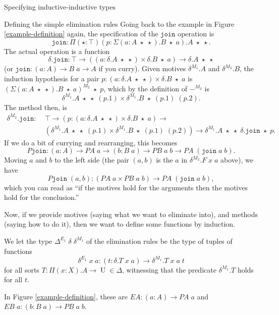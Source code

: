 \documentclass[acmsmall,review]{acmart}\settopmatter{printfolios=true,printccs=false,printacmref=false}
\DeclareMathOperator{\UU}{U}
\newcommand{\join}{\texttt{join}}
\begin{document}
\begin{section}{Specifying inductive-inductive types}
\begin{subsection}{\label{simple-elim-section}Defining the simple elimination rules}
Going back to the example in Figure \ref{example-definition} again, the specification of the $\join$ operation is \[\join : \Pi(\star : \top)(p : \Sigma(a : A\;\star\;\star).B\;\star\;a).A\;\star\;\star.\]
The actual operation is a function \[\delta.\join : \top \to ((a : \delta.A\;\star\;\star)\times \delta.B\;\star\;a) \to \delta.A\;\star\;\star\] (or $\join : (a : A) \to B\;a \to A$ if you curry).
Given motives $\delta^{M_1}.A$ and $\delta^{M_2}.B$, the induction hypothesis for a pair $p : (a : \delta.A\;\star\;\star)\times \delta.B\;\star\;a$ is $(\Sigma(a : A\;\star\;\star).B\;\star\;a)^{M_2}\;\star\;p$, which by the definition of $-^{M_2}$ is \[\delta^{M_1}.A\;\star\;\star\;(p.1) \times \delta^{M_1}.B\;\star\;(p.1)\;(p.2).\] The method then, is \begin{align*}\delta^{M_2}.\join :&\; \top \to (p : (a : \delta.A\;\star\;\star)\times \delta.B\;\star\;a) \to\\&\; (\delta^{M_1}.A\;\star\;\star\;(p.1) \times \delta^{M_1}.B\;\star\;(p.1)\;(p.2)) \to \delta^{M_1}.A\;\star\;\star\;\delta.\join\;\star\;p.\end{align*} If we do a bit of currying and rearranging, this becomes \[P\join : (a : A) \to PA\;a \to (b : B\;a) \to PB\;a\;b \to PA\;(\join\;a\;b).\] Moving $a$ and $b$ to the left side (the pair $(a, b)$ is the $a$ in $\delta^{M_2}.F\;x\;a$ above), we have \[P\join\;(a, b) : (PA\;a \times PB\;a\;b) \to PA\;(\join\;a\;b),\] which you can read as ``if the motives hold for the arguments then the motives hold for the conclusion.''

Now, if we provide motives (saying what we want to eliminate into), and methods (saying how to do it), then we want to define some functions by induction.

\begin{definition}
We let the type $\Delta^{E_1}\;\delta\;\delta^{M_1}$ of the elimination rules be the type of tuples of functions \[\delta^{E_1} \;x\;a : (t : \delta.T\;x\;a) \to \delta^{M_1}.T\;x\;a\;t \] for all sorts $T : \Pi(x : X).A\to\UU \in\Delta$, witnessing that the predicate $\delta^{M_1}.T$ holds for all $t$.
\end{definition}

In Figure \ref{example-definition}, these are $EA : (a : A) \to PA\;a$ and $EB\;a : (b : B\;a) \to PB\;a\;b$.


\end{subsection}
\end{section}
\end{document}
